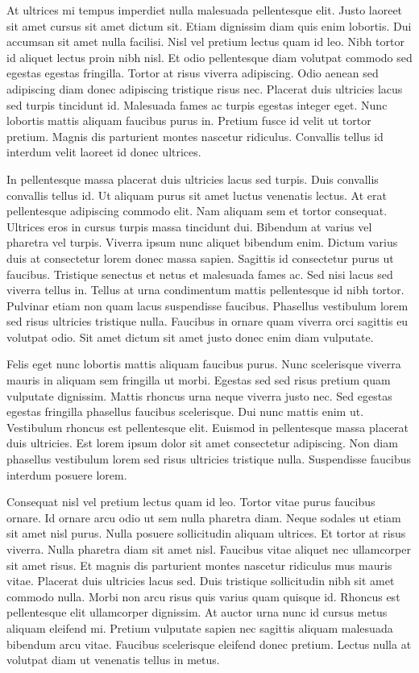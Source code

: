\documentclass[
]{book}
\theoremstyle{definition}
\theoremstyle{definition}
\theoremstyle{definition}
\theoremstyle{definition}
\theoremstyle{remark}
\begin{document}
At ultrices mi tempus imperdiet nulla malesuada pellentesque elit. Justo laoreet sit amet cursus sit amet dictum sit. Etiam dignissim diam quis enim lobortis. Dui accumsan sit amet nulla facilisi. Nisl vel pretium lectus quam id leo. Nibh tortor id aliquet lectus proin nibh nisl. Et odio pellentesque diam volutpat commodo sed egestas egestas fringilla. Tortor at risus viverra adipiscing. Odio aenean sed adipiscing diam donec adipiscing tristique risus nec. Placerat duis ultricies lacus sed turpis tincidunt id. Malesuada fames ac turpis egestas integer eget. Nunc lobortis mattis aliquam faucibus purus in. Pretium fusce id velit ut tortor pretium. Magnis dis parturient montes nascetur ridiculus. Convallis tellus id interdum velit laoreet id donec ultrices.

In pellentesque massa placerat duis ultricies lacus sed turpis. Duis convallis convallis tellus id. Ut aliquam purus sit amet luctus venenatis lectus. At erat pellentesque adipiscing commodo elit. Nam aliquam sem et tortor consequat. Ultrices eros in cursus turpis massa tincidunt dui. Bibendum at varius vel pharetra vel turpis. Viverra ipsum nunc aliquet bibendum enim. Dictum varius duis at consectetur lorem donec massa sapien. Sagittis id consectetur purus ut faucibus. Tristique senectus et netus et malesuada fames ac. Sed nisi lacus sed viverra tellus in. Tellus at urna condimentum mattis pellentesque id nibh tortor. Pulvinar etiam non quam lacus suspendisse faucibus. Phasellus vestibulum lorem sed risus ultricies tristique nulla. Faucibus in ornare quam viverra orci sagittis eu volutpat odio. Sit amet dictum sit amet justo donec enim diam vulputate.

Felis eget nunc lobortis mattis aliquam faucibus purus. Nunc scelerisque viverra mauris in aliquam sem fringilla ut morbi. Egestas sed sed risus pretium quam vulputate dignissim. Mattis rhoncus urna neque viverra justo nec. Sed egestas egestas fringilla phasellus faucibus scelerisque. Dui nunc mattis enim ut. Vestibulum rhoncus est pellentesque elit. Euismod in pellentesque massa placerat duis ultricies. Est lorem ipsum dolor sit amet consectetur adipiscing. Non diam phasellus vestibulum lorem sed risus ultricies tristique nulla. Suspendisse faucibus interdum posuere lorem.

Consequat nisl vel pretium lectus quam id leo. Tortor vitae purus faucibus ornare. Id ornare arcu odio ut sem nulla pharetra diam. Neque sodales ut etiam sit amet nisl purus. Nulla posuere sollicitudin aliquam ultrices. Et tortor at risus viverra. Nulla pharetra diam sit amet nisl. Faucibus vitae aliquet nec ullamcorper sit amet risus. Et magnis dis parturient montes nascetur ridiculus mus mauris vitae. Placerat duis ultricies lacus sed. Duis tristique sollicitudin nibh sit amet commodo nulla. Morbi non arcu risus quis varius quam quisque id. Rhoncus est pellentesque elit ullamcorper dignissim. At auctor urna nunc id cursus metus aliquam eleifend mi. Pretium vulputate sapien nec sagittis aliquam malesuada bibendum arcu vitae. Faucibus scelerisque eleifend donec pretium. Lectus nulla at volutpat diam ut venenatis tellus in metus.
\end{document}
